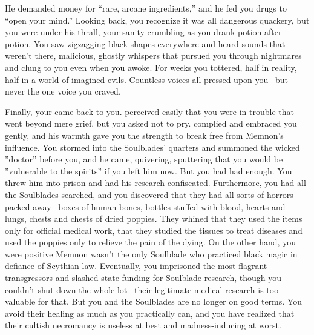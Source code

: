 \documentclass[char]{Kos}
\begin{document}
He demanded money for ``rare, arcane ingredients,'' and he fed you drugs to ``open your mind.'' Looking back, you recognize it was all dangerous quackery, but you were under his thrall, your sanity crumbling as you drank potion after potion. You saw zigzagging black shapes everywhere and heard sounds that weren't there, malicious, ghostly whispers that pursued you through nightmares and clung to you even when you awoke. For weeks you tottered, half in reality, half in a world of imagined evils. Countless voices all pressed upon you-- but never the one voice you craved.

Finally, your \cScythiaKing{\spouse} came back to you. \cScythiaKing{\They} perceived easily that you were in trouble that went beyond mere grief, but you asked \cScythiaKing{\them} not to pry. \cScythiaKing{\They} complied and embraced you gently, and his warmth gave you the strength to break free from Memnon's influence. You stormed into the Soulblades' quarters and summoned the wicked ''doctor'' before you, and he came, quivering, sputtering that you would be ''vulnerable to the spirits'' if you left him now. But you had had enough. You threw him into prison and had his research confiscated. Furthermore, you had all the Soulblades searched, and you discovered that they had all sorts of horrors packed away-- boxes of human bones, bottles stuffed with blood, hearts and lungs, chests and chests of dried poppies. They whined that they used the items only for official medical work, that they studied the tissues to treat diseases and used the poppies only to relieve the pain of the dying. On the other hand, you were positive Memnon wasn't the only Soulblade who practiced black magic in defiance of Scythian law. Eventually, you imprisoned the most flagrant transgressors and slashed state funding for Soulblade research, though you couldn't shut down the whole lot-- their legitimate medical research is too valuable for that. But you and the Soulblades are no longer on good terms. You avoid their healing as much as you practically can, and you have realized that their cultish necromancy is useless at best and madness-inducing at worst.
\end{document}
